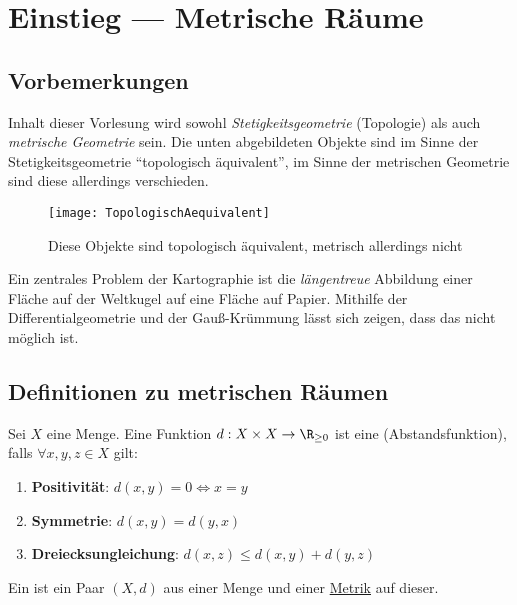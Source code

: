 \chapter{Einstieg --- Metrische Räume}

\section{Vorbemerkungen}

Inhalt dieser Vorlesung wird sowohl \emph{Stetigkeitsgeometrie} (Topologie) als auch \emph{metrische Geometrie} sein. Die unten abgebildeten Objekte sind im Sinne der Stetigkeitsgeometrie ``topologisch äquivalent'', im Sinne der metrischen Geometrie sind diese allerdings verschieden.

\begin{figure}[H]
  \texttt{[image: TopologischAequivalent]}
  \caption{Diese Objekte sind topologisch äquivalent, metrisch allerdings nicht}
\end{figure}

\begin{remark}[Kartographieproblem]
  Ein zentrales Problem der Kartographie ist die \emph{längentreue} Abbildung einer Fläche auf der Weltkugel auf eine Fläche auf Papier. Mithilfe der Differentialgeometrie und der Gauß-Krümmung lässt sich zeigen, dass das nicht möglich ist.
\end{remark}

\section{Definitionen zu metrischen Räumen}

\begin{definition}[Metrik]\label{def:metrik}
  Sei \( X \) eine Menge. Eine Funktion \( d: X \times X \to \R_{\geq 0} \) ist eine  (Abstandsfunktion), falls \( \forall x, y, z \in X \) gilt:
  \begin{enumerate}
    \item \textbf{Positivität}: \( d(x, y) = 0 \Leftrightarrow x = y \) 
    \item \textbf{Symmetrie}: \( d(x,y) = d(y,x) \)
    \item \textbf{Dreiecksungleichung}: \( d(x,z) \leq d(x,y) + d(y,z) \)
  \end{enumerate}
\end{definition}

\begin{definition}\label{def:metrischerRaum}
  Ein  ist ein Paar \( (X,d) \) aus einer Menge und einer \hyperref[def:metrik]{Metrik} auf dieser.
\end{definition}

